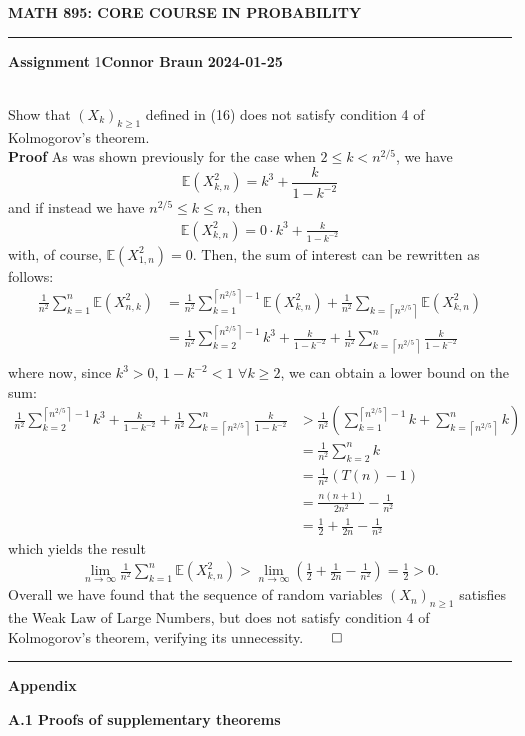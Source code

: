 \documentclass[10pt]{article}
\newcommand{\E}{\mathbb{E}}
\newcommand{\bp}[1]{\left({#1}\right)}
\newcommand{\1}[1]{\mathbbm{1}_{#1}}
\newcommand*{\ceil}[1]{\left\lceil#1\right\rceil}
\begin{document}
    \begin{center}
        {\bf\large{MATH 895: CORE COURSE IN PROBABILITY}}
        \smallskip
        \hrule
        \smallskip
        {\bf Assignment} 1\hfill {\bf Connor Braun} \hfill {\bf 2024-01-25}
    \end{center}
    \\[5pt]
    Show that $(X_k)_{k\geq 1}$ defined in (16) does not satisfy condition 4 of Kolmogorov's theorem.\\[5pt]
    {\bf Proof}\hspace{5pt} As was shown previously for the case when $2\leq k<n^{2/5}$, we have
    \[\E(X_{k,n}^2)=k^3+\frac{k}{1-k^{-2}}\]
    and if instead we have $n^{2/5}\leq k\leq n$, then
    \begin{align*}
        \E(X_{k,n}^2)=0\cdot k^3+\frac{k}{1-k^{-2}}
    \end{align*}
    with, of course, $\E(X_{1,n}^2)=0$. Then, the sum of interest can be rewritten as follows:
    \begin{align*}
        \frac{1}{n^2}\sum_{k=1}^n\E(X_{n,k}^2)&=\frac{1}{n^2}\sum_{k=1}^{\ceil{n^{2/5}}-1}\E(X_{k,n}^2)+\frac{1}{n^2}\sum_{k=\ceil{n^{2/5}}}\E(X_{k,n}^2)\\
        &=\frac{1}{n^2}\sum_{k=2}^{\ceil{n^{2/5}}-1}k^3+\frac{k}{1-k^{-2}}+\frac{1}{n^2}\sum_{k=\ceil{n^{2/5}}}^n\frac{k}{1-k^{-2}}\\
    \end{align*}
    where now, since $k^3>0$, $1-k^{-2}<1$ $\forall k\geq 2$, we can obtain a lower bound on the sum:
    \begin{align*}
        \frac{1}{n^2}\sum_{k=2}^{\ceil{n^{2/5}}-1}k^3+\frac{k}{1-k^{-2}}+\frac{1}{n^2}\sum_{k=\ceil{n^{2/5}}}^n\frac{k}{1-k^{-2}}
        &>\frac{1}{n^2}\bp{\sum_{k=1}^{\ceil{n^{2/5}}-1}k+\sum_{k=\ceil{n^{2/5}}}^nk}\\
        &=\frac{1}{n^2}\sum_{k=2}^nk\\
        &=\frac{1}{n^2}\bp{T(n)-1}\\
        &=\frac{n(n+1)}{2n^2}-\frac{1}{n^2}\\
        &=\frac{1}{2}+\frac{1}{2n}-\frac{1}{n^2}
    \end{align*}
    which yields the result
    \begin{align*}
        \lim_{n\rightarrow\infty}\frac{1}{n^2}\sum_{k=1}^n\E(X_{k,n}^2)>\lim_{n\rightarrow\infty}\bp{\frac{1}{2}+\frac{1}{2n}-\frac{1}{n^2}}=\frac{1}{2}>0.
    \end{align*}
    Overall we have found that the sequence of random variables $(X_n)_{n\geq 1}$ satisfies the Weak Law of Large Numbers, but does not satisfy condition 4 of Kolmogorov's theorem, verifying its unnecessity.\hfill{$\qed$}
    \\[5pt]
    \hrule
    \begin{center}
        {\bf\large Appendix}
    \end{center}
    {\bf A.1\hspace{5pt} Proofs of supplementary theorems}
    
\end{document}
